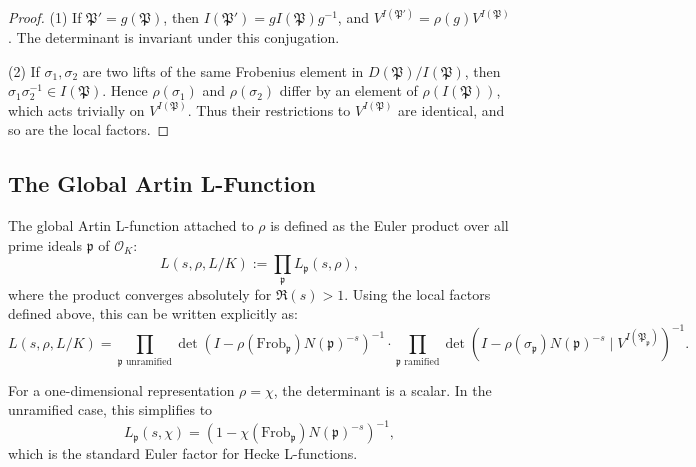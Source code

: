 \begin{proof}
(1) If \(\mathfrak{P}' = g(\mathfrak{P})\), then \(I(\mathfrak{P}') = g I(\mathfrak{P}) g^{-1}\), and \(V^{I(\mathfrak{P}')} = \rho(g) V^{I(\mathfrak{P})}\). The determinant is invariant under this conjugation.

(2) If \(\sigma_1, \sigma_2\) are two lifts of the same Frobenius element in \(D(\mathfrak{P})/I(\mathfrak{P})\), then \(\sigma_1 \sigma_2^{-1} \in I(\mathfrak{P})\). Hence \(\rho(\sigma_1)\) and \(\rho(\sigma_2)\) differ by an element of \(\rho(I(\mathfrak{P}))\), which acts trivially on \(V^{I(\mathfrak{P})}\). Thus their restrictions to \(V^{I(\mathfrak{P})}\) are identical, and so are the local factors.
\end{proof}

\subsection{The Global Artin L-Function}

The global Artin L-function attached to \(\rho\) is defined as the Euler product over all prime ideals \(\mathfrak{p}\) of \(\mathcal{O}_K\):
\[
L(s, \rho, L/K) := \prod_{\mathfrak{p}} L_{\mathfrak{p}}(s, \rho),
\]
where the product converges absolutely for \(\Re(s) > 1\). Using the local factors defined above, this can be written explicitly as:
\[
L(s, \rho, L/K) =
\prod_{\mathfrak{p} \text{ unramified}}
\det\!\left( I - \rho(\mathrm{Frob}_{\mathfrak{p}}) N(\mathfrak{p})^{-s} \right)^{-1}
\cdot
\prod_{\mathfrak{p} \text{ ramified}}
\det\!\left( I - \rho(\sigma_{\mathfrak{p}}) N(\mathfrak{p})^{-s} \mid V^{I(\mathfrak{P}_{\mathfrak{p}})} \right)^{-1}.
\]

\begin{remark}
For a one-dimensional representation \(\rho = \chi\), the determinant is a scalar. In the unramified case, this simplifies to
\[
L_{\mathfrak{p}}(s, \chi) = \left(1 - \chi(\mathrm{Frob}_{\mathfrak{p}}) N(\mathfrak{p})^{-s}\right)^{-1},
\]
which is the standard Euler factor for Hecke L-functions.
\end{remark}